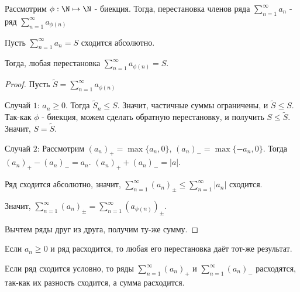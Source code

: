 \begin{definition} \thmslashn 

    Рассмотрим $\phi : \N \mapsto \N$ - биекция. Тогда, перестановка членов ряда $\sum\limits_{n=1}^{\infty} a_{n}$ - ряд $\sum\limits_{n=1}^{\infty} a_{\phi(n)}$
\end{definition}
\begin{theorem} \thmslashn

    Пусть $\sum\limits_{n=1}^{\infty} a_{n} = S$ сходится абсолютно.

    Тогда, любая перестановка $\sum\limits_{n=1}^{\infty} a_{\phi(n)} = S$.
    \begin{proof} \thmslashn
    
        Пусть $\tilde{S} = \sum\limits_{n=1}^{\infty} a_{\phi(n)}$

        Случай $1$: $a_{n} \ge 0$. Тогда $\tilde{S}_{n} \le S$. Значит, частичные суммы ограничены, и $\tilde{S} \le S$. Так-как $\phi$ - биекция, можем сделать обратную перестановку, и получить $S \le \tilde{S}$. Значит, $S = \tilde{S}$.

        Случай $2$: Рассмотрим $(a_{n})_{+} = \max \{a_{n}, 0\} $, $(a_{n})_{-} = \max \{-a_{n}, 0\} $. Тогда $(a_{n})_{+} - (a_{n})_{-} = a_{n}$. $(a_{n})_{+} + (a_{n})_{-} = |a|$.

        Ряд сходится абсолютно, значит, $\sum\limits_{n=1}^{\infty} (a_{n})_{\pm} \le \sum\limits_{n=1}^{\infty} |a_{n}|$ сходится.

        Значит, $\sum\limits_{n=1}^{\infty} (a_{n})_{\pm} = \sum\limits_{n=1}^{\infty} (a_{\phi(n)})_{\pm}$.

        Вычтем ряды друг из друга, получим ту-же сумму.
    \end{proof}
\end{theorem}
\begin{remark} \thmslashn

    Если $a_{n} \ge 0$ и ряд расходится, то любая его перестановка даёт тот-же результат.

    Если ряд сходится условно, то ряды $\sum\limits_{n=1}^{\infty} (a_{n})_{+}$ и $\sum\limits_{n=1}^{\infty} (a_{n})_{-}$ расходятся, так-как их разность сходится, а сумма расходится.
\end{remark}
